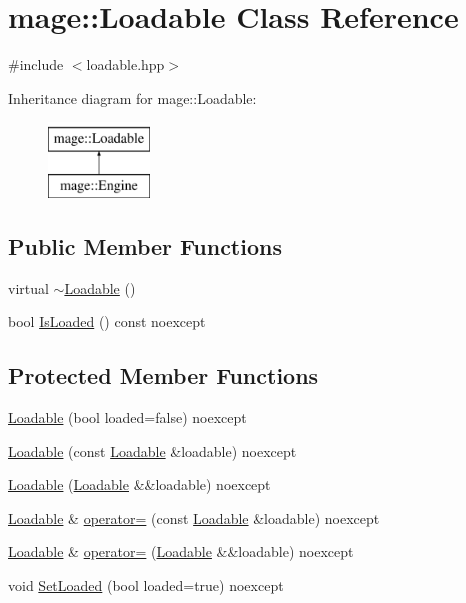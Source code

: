 \hypertarget{classmage_1_1_loadable}{}\section{mage\+:\+:Loadable Class Reference}
\label{classmage_1_1_loadable}


{\ttfamily \#include $<$loadable.\+hpp$>$}

Inheritance diagram for mage\+:\+:Loadable\+:\begin{figure}[H]
\begin{center}
\leavevmode
\includegraphics[height=2.000000cm]{classmage_1_1_loadable}
\end{center}
\end{figure}
\subsection*{Public Member Functions}
\begin{DoxyCompactItemize}
\item 
virtual \hyperlink{classmage_1_1_loadable_a8088935f7536c0c77ddb34a29ece63b1}{$\sim$\+Loadable} ()
\item 
bool \hyperlink{classmage_1_1_loadable_ae5489e70602ed829212b420b2e354108}{Is\+Loaded} () const noexcept
\end{DoxyCompactItemize}
\subsection*{Protected Member Functions}
\begin{DoxyCompactItemize}
\item 
\hyperlink{classmage_1_1_loadable_a7e702d425db455dbe0630c02a72f9d07}{Loadable} (bool loaded=false) noexcept
\item 
\hyperlink{classmage_1_1_loadable_aefd54800fd0711bdcb9c66d8df3c25a5}{Loadable} (const \hyperlink{classmage_1_1_loadable}{Loadable} \&loadable) noexcept
\item 
\hyperlink{classmage_1_1_loadable_ad41faf3735ef05dd2828b8ab3d1b6a78}{Loadable} (\hyperlink{classmage_1_1_loadable}{Loadable} \&\&loadable) noexcept
\item 
\hyperlink{classmage_1_1_loadable}{Loadable} \& \hyperlink{classmage_1_1_loadable_a3474428ce8f4b183f121cecf8f2c8add}{operator=} (const \hyperlink{classmage_1_1_loadable}{Loadable} \&loadable) noexcept
\item 
\hyperlink{classmage_1_1_loadable}{Loadable} \& \hyperlink{classmage_1_1_loadable_a553b6c96536fc6d8c38fdf766bf55402}{operator=} (\hyperlink{classmage_1_1_loadable}{Loadable} \&\&loadable) noexcept
\item 
void \hyperlink{classmage_1_1_loadable_adb8689c0dfc46138ac72768da897dc8f}{Set\+Loaded} (bool loaded=true) noexcept
\end{DoxyCompactItemize}
